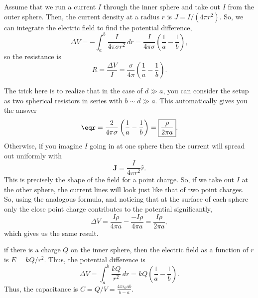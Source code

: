 \documentclass[11pt]{scrartcl}
\begin{document}
\begin{alphasol}
    \item Assume that we run a current $I$ through the inner sphere and take out $I$ from the outer sphere. Then, the current density at a radius $r$ is $J = I/(4\pi r^2)$. So, we can integrate the electric field to find the potential difference,
    $$\Delta V = -\int_a^b \frac{ I}{4\pi \sigma r^2} \, dr = \frac{I}{4\pi \sigma} \left(\frac 1a - \frac 1b \right),$$
    so the resistance is
    $$R = \frac{\Delta V}{I} = \frac{\sigma}{4\pi} \left(\frac 1a - \frac 1b\right).$$
    \item The trick here is to realize that in the case of $d \gg a$, you can consider the setup as two spherical resistors in series with $b \sim d \gg a$. This automatically gives you the answer
    $$\eqr = \frac{2}{4\pi \sigma}\left(\frac 1a - \frac 1b\right) = \boxed{\frac{\rho}{2\pi a}}.$$
    Otherwise, if you imagine $I$ going in at one sphere then the current will spread out uniformly with
    $$\mathbf J = \frac{I}{4\pi r^2} \hat r.$$
    This is precisely the shape of the field for a point charge. So, if we take out $I$ at the other sphere, the current lines will look just like that of two point charges. So, using the analogous formula, and noticing that at the surface of each sphere only the close point charge contributes to the potential significantly,
    $$\Delta V = \frac{I\rho }{4\pi a} - \frac{-I\rho}{4\pi  a} = \frac{I\rho}{2\pi a},$$
    which gives us the same result.
    \item if there is a charge $Q$ on the inner sphere, then the electric field as a function of $r$ is $E = kQ/r^2$. Thus, the potential difference is
    $$\Delta V = \int_a^b \frac{kQ}{r^2} \, dr = kQ\left(\frac 1a - \frac 1b\right).$$
    Thus, the capacitance is $C = Q/V = \frac{4\pi \epsilon_0 ab}{b-a}.$
\end{alphasol}
\end{document}
